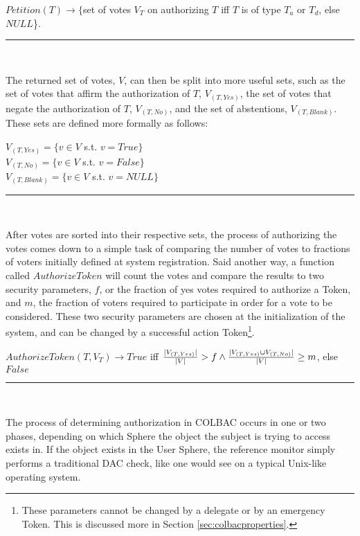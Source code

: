 \begin{definition}\label{def:petition}
$Petition(T) \rightarrow \{$set of votes $V_{T}$ on authorizing $T$ iff $T$ is
of type $T_{a}$ or $T_{d}$, else $NULL$\}.\\
\hrule \mbox{}\\
\end{definition}

\noindent The returned set of votes, $V$, can then be split into more useful
sets, such as the set of votes that affirm the authorization of $T$,
$V_{(T, Yes)}$, the set of votes that negate the authorization of $T$,
$V_{(T, No)}$, and the set of abstentions, $V_{(T, Blank)}$. These sets are
defined more formally as follows:

\begin{definition}\label{def:votes}
$V_{(T, Yes)} = \{v \in V$ s.t. $v = True\}$\\
$V_{(T, No)} = \{v \in V$ s.t. $v = False\}$\\
$V_{(T, Blank)} = \{v \in V$ s.t. $v = NULL\}$\\
\hrule\mbox{}\\
\end{definition}

\noindent After votes are sorted into their respective sets, the process of
authorizing the votes comes down to a simple task of comparing the number of
votes to fractions of voters initially defined at system registration. Said
another way, a function called $AuthorizeToken$ will count the votes and compare
the results to two security parameters, $f$, or the fraction of yes votes
required to authorize a Token, and $m$, the fraction of voters required to
participate in order for a vote to be considered. These two security parameters
are chosen at the initialization of the system, and can be changed by a
successful action Token\footnote{These parameters cannot be changed by a
delegate or by an emergency Token. This is discussed more in Section
\ref{sec:colbacproperties}.}.
\begin{definition}
$AuthorizeToken(T,V_{T}) \rightarrow True$ iff $\frac{|V_{(T, Yes)}|}{|V|} > f
\wedge \\ \frac{|V_{(T,Yes)} \cup V_{(T, No)}|}{|V|} \ge m$, else $False$\\
\hrule\mbox{}\\
\end{definition}

The process of determining authorization in COLBAC occurs in one or two phases,
depending on which Sphere the object the subject is trying to access exists in.
If the object exists in the User Sphere, the reference monitor simply performs a
traditional DAC check, like one would see on a typical Unix-like operating
system.

